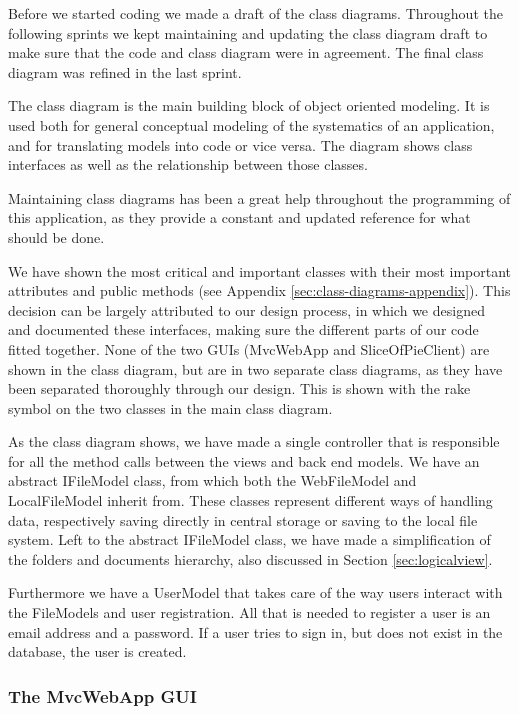 Before we started coding we made a draft of the class diagrams. Throughout the following sprints we kept maintaining and updating the class diagram
draft to make sure that the code and class diagram were in agreement. The final class diagram was refined in the last sprint.

The class diagram is the main building block of object oriented modeling. It is used both for general conceptual modeling of the systematics 
of an application, and for translating models into code or vice versa. The diagram
shows class interfaces as well as the relationship between those classes.

Maintaining class diagrams has been a great help throughout the programming of this application, as they provide a constant and updated reference
for what should be done.

We have shown the most critical and important classes with their most important attributes and public methods (see Appendix \ref{sec:class-diagrams-appendix}). This decision can be largely attributed
to our design process, in which we designed and documented these interfaces, making sure the different parts of our code fitted together.
None of the two GUIs (MvcWebApp and SliceOfPieClient) are shown in the class diagram, but are in two separate class diagrams, as they have been separated
thoroughly through our design. This is shown with the rake symbol on the two classes in the main class diagram.

As the class diagram shows, we have made a single controller that is responsible for all the method calls between the views and back end models. We
have an abstract IFileModel class, from which both the WebFileModel and LocalFileModel inherit from. These classes represent different ways of handling
data, respectively saving directly in central storage or saving to the local file system. Left to the abstract IFileModel class, we have
made a simplification of the folders and documents hierarchy, also discussed in Section \ref{sec:logicalview}.

Furthermore we have a UserModel that takes care of the way users interact with the FileModels and user registration. All that is needed
to register a user is an email address and a password. If a user tries to sign in, but does not exist in the database, the user is created.

\subsubsection{The MvcWebApp GUI}

